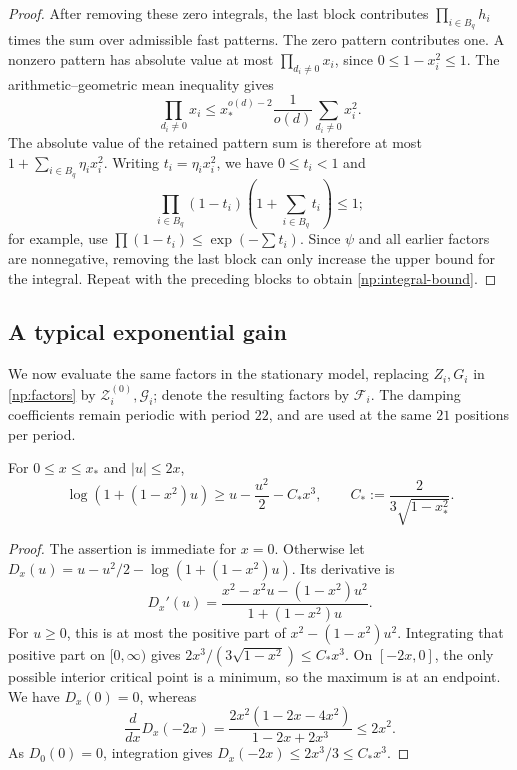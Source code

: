 \begin{proof}
After removing these zero integrals, the last block contributes
\(\prod_{i\in B_q}h_i\) times the sum over admissible fast patterns.
The zero pattern contributes one. A nonzero pattern has absolute value
at most \(\prod_{d_i\ne0}x_i\), since \(0\le1-x_i^2\le1\).
The arithmetic--geometric mean inequality gives
\[
 \prod_{d_i\ne0}x_i
 \le x_*^{o(d)-2}\frac1{o(d)}\sum_{d_i\ne0}x_i^2.
\]
The absolute value of the retained pattern sum is therefore at most
\(1+\sum_{i\in B_q}\eta_i x_i^2\). Writing \(t_i=\eta_i x_i^2\),
we have \(0\le t_i<1\) and
\[
 \prod_{i\in B_q}(1-t_i)\left(1+\sum_{i\in B_q}t_i\right)\le1;
\]
for example, use \(\prod(1-t_i)\le\exp(-\sum t_i)\).
Since \(\psi\) and all earlier factors are nonnegative, removing the
last block can only increase the upper bound for the integral. Repeat
with the preceding blocks to obtain \eqref{np:integral-bound}.
\end{proof}

\subsection{A typical exponential gain}
\label{np:gain-section}

We now evaluate the same factors in the stationary model, replacing
\(Z_i,G_i\) in \eqref{np:factors} by
\(\mathcal Z_i^{(0)},\mathcal G_i\); denote the resulting factors by
\(\mathcal F_i\). The damping coefficients remain periodic with period
\(22\), and are used at the same \(21\) positions per period.

\begin{lemma}\label{np:log-inequality}
For \(0\le x\le x_*\) and \(|u|\le2x\),
\begin{equation}
 \log(1+(1-x^2)u)\ge u-\frac{u^2}{2}-C_*x^3,
 \qquad C_*:=\frac2{3\sqrt{1-x_*^2}}.
 \label{np:log-bound}
\end{equation}
\end{lemma}

\begin{proof}
The assertion is immediate for \(x=0\). Otherwise let
\(D_x(u)=u-u^2/2-\log(1+(1-x^2)u)\). Its derivative is
\[
 D_x'(u)=\frac{x^2-x^2u-(1-x^2)u^2}{1+(1-x^2)u}.
\]
For \(u\ge0\), this is at most the positive part of
\(x^2-(1-x^2)u^2\). Integrating that positive part on \([0,\infty)\)
gives \(2x^3/(3\sqrt{1-x^2})\le C_*x^3\).
On \([-2x,0]\), the only possible interior critical point is a minimum,
so the maximum is at an endpoint. We have \(D_x(0)=0\), whereas
\[
 \frac{d}{dx}D_x(-2x)
 =\frac{2x^2(1-2x-4x^2)}{1-2x+2x^3}\le2x^2.
\]
As \(D_0(0)=0\), integration gives
\(D_x(-2x)\le2x^3/3\le C_*x^3\).
\end{proof}

